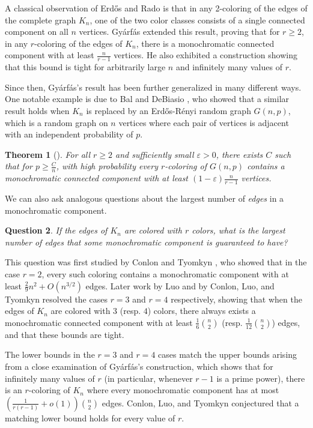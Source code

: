 \documentclass[12pt]{amsart}
\newtheorem{theorem}{Theorem}[section]
\newtheorem{question}[theorem]{Question}
\theoremstyle{definition}
\numberwithin{equation}{section}
\begin{document}
A classical observation of Erdős and Rado is that in any 2-coloring of the edges of the complete graph $K_n$, one of the two color classes consists of a single connected component on all $n$ vertices. 
Gy\'arf\'as \cite{gya} extended this result, proving that for $r\ge 2$, in any $r$-coloring of the edges of $K_n$, there is 
a monochromatic connected component with at least $\frac{n}{r-1}$ vertices. He also exhibited a construction showing that this bound is tight for 
arbitrarily large $n$ and infinitely many values of $r$. 

Since then, Gy\'arf\'as's result has been further generalized in many different ways. One notable example is due to Bal and DeBiasio \cite{bd}, who showed that a similar result holds when $K_n$ is replaced by an Erd\H{o}s-Rényi random graph $G(n,p)$, which is a random graph on $n$ vertices where each pair of vertices is adjacent with an independent probability of $p$.

\begin{theorem}[\cite{bd}]\label{thm:bd}
    For all $r\ge 2$ and sufficiently small $\varepsilon >0$, there exists $C$ such that for $p\ge \frac{C}{n}$, with high probability every $r$-coloring of $G(n,p)$ contains a monochromatic connected component with at least $(1-\varepsilon)\frac{n}{r-1}$ vertices.
\end{theorem}

We can also ask analogous questions about the largest number of \emph{edges} in a monochromatic component.

\begin{question}\label{q:rcolor}
    If the edges of $K_n$ are colored with $r$ colors, what is the largest number of edges that some monochromatic component is guaranteed to have?
\end{question}
This question was first studied by Conlon and Tyomkyn \cite{ct}, who showed that in the case $r=2$, every such coloring contains a monochromatic component with at least $\frac{2}{9}n^2+O(n^{3/2})$ edges. Later work by Luo \cite{sluo} and by Conlon, Luo, and Tyomkyn \cite{clt} resolved the cases $r=3$ and $r=4$ respectively, showing that when the edges of $K_n$ are colored with $3$ (resp. $4$) colors, there always exists a monochromatic connected component with at least $\frac{1}{6}\binom{n}{2}$ (resp. $\frac{1}{12}\binom{n}{2}$) edges, and that these bounds are tight.

The lower bounds in the $r=3$ and $r=4$ cases match the upper bounds arising from a close examination of Gy\'arf\'as's construction, which shows that for infinitely many values of $r$ (in particular, whenever $r-1$ is a prime power), there is an $r$-coloring of $K_n$ where every monochromatic component has at most $(\frac{1}{r(r-1)}+o(1))\binom{n}{2}$ edges. Conlon, Luo, and Tyomkyn conjectured that a matching lower bound holds for every value of $r$.
\end{document}
